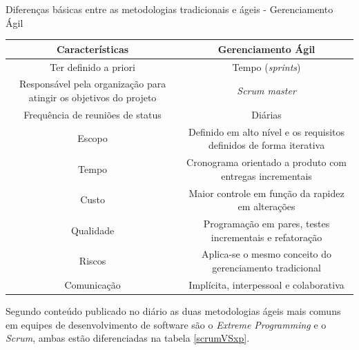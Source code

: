 \begin{quadro}[h]
\centering
{}
\caption{Diferenças básicas entre as metodologias tradicionais e ágeis - Gerenciamento Ágil}
\vspace{0.5cm}
\begin{tabular}{c|c}
 
\textbf{Características} & \textbf{Gerenciamento Ágil} \\ %
\hline                               %
Ter definido a priori & Tempo (\textit{sprints}) \\
Responsável pela organização para atingir os objetivos do projeto & \textit{Scrum master} \\
Frequência de reuniões de status & Diárias \\
Escopo & Definido em alto nível e os requisitos definidos de forma iterativa \\
Tempo & Cronograma orientado a produto com entregas incrementais \\          %
Custo & Maior controle em função da rapidez em alterações \\
Qualidade & Programação em pares, testes incrementais e refatoração \\
Riscos & Aplica-se o mesmo conceito do gerenciamento tradicional \\
Comunicação & Implícita, interpessoal e colaborativa \\
\hline
\end{tabular}
\label{metodologia-agil}
\end{quadro}

Segundo conteúdo publicado no diário  as duas metodologias ágeis mais comuns em equipes de desenvolvimento de software são o \textit{Extreme Programming} e o \textit{Scrum}, ambas estão diferenciadas na tabela \ref{scrumVSxp}.


\newpage

